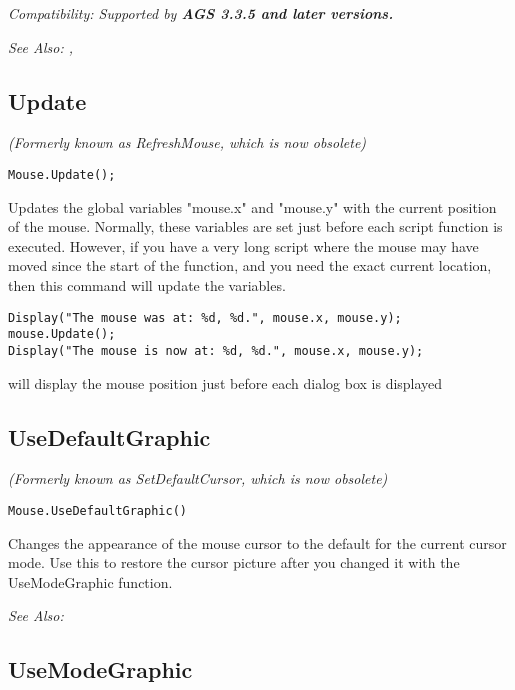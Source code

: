\it{Compatibility:} Supported by \bf{AGS 3.3.5} and later versions.

\it{See Also:} ,


\subsection{Update}\label{Mouse.Update}%

\it{(Formerly known as RefreshMouse, which is now obsolete)}

\begin{verbatim}
Mouse.Update();
\end{verbatim}
Updates the global variables "mouse.x" and "mouse.y" with the current
position of the mouse. Normally, these variables are set just before each
script function is executed. However, if you have a very long script where
the mouse may have moved since the start of the function, and you need the
exact current location, then this command will update the variables.

\begin{verbatim}
Display("The mouse was at: %d, %d.", mouse.x, mouse.y);
mouse.Update();
Display("The mouse is now at: %d, %d.", mouse.x, mouse.y);
\end{verbatim}
will display the mouse position just before each dialog box is displayed


\subsection{UseDefaultGraphic}\label{Mouse.UseDefaultGraphic}%

\it{(Formerly known as SetDefaultCursor, which is now obsolete)}

\begin{verbatim}
Mouse.UseDefaultGraphic()
\end{verbatim}
Changes the appearance of the mouse cursor to the default for the current
cursor mode. Use this to restore the cursor picture after you changed it
with the UseModeGraphic function.

\it{See Also:} 


\subsection{UseModeGraphic}\label{Mouse.UseModeGraphic}%

